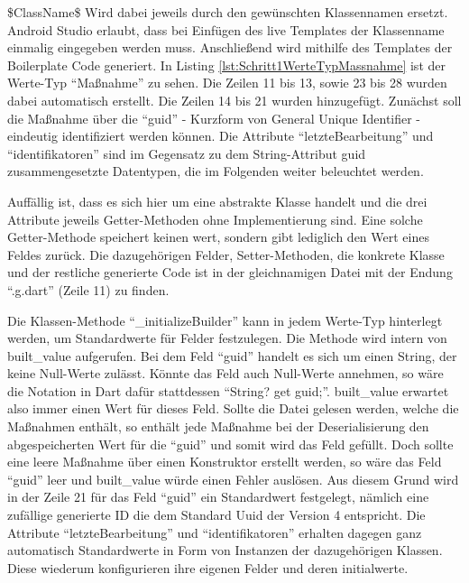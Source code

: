 \$ClassName\$ Wird dabei jeweils durch den gewünschten Klassennamen ersetzt. Android Studio erlaubt, dass bei Einfügen des live Templates der Klassenname einmalig eingegeben werden muss.  Anschließend wird mithilfe des Templates der Boilerplate Code generiert. In Listing \ref{lst:Schritt1WerteTypMassnahme} ist der Werte-Typ \enquote{Maßnahme} zu sehen. Die Zeilen 11 bis 13, sowie 23 bis 28 wurden dabei automatisch erstellt. Die Zeilen 14 bis 21 wurden hinzugefügt. Zunächst soll die Maßnahme über die \enquote{guid} - Kurzform von General Unique Identifier - eindeutig identifiziert werden können.
Die Attribute \enquote{letzteBearbeitung} und \enquote{identifikatoren} sind im Gegensatz zu dem String-Attribut guid zusammengesetzte Datentypen, die im Folgenden weiter beleuchtet werden.

Auffällig ist, dass es sich hier um eine abstrakte Klasse handelt und die drei Attribute jeweils Getter-Methoden ohne Implementierung sind. Eine solche Getter-Methode speichert keinen wert, sondern gibt lediglich den Wert eines Feldes zurück. Die dazugehörigen Felder,  Setter-Methoden, die konkrete Klasse und der restliche generierte Code ist in der gleichnamigen Datei mit der Endung \enquote{.g.dart} (Zeile 11) zu finden.

Die Klassen-Methode \enquote{_initializeBuilder} kann in jedem Werte-Typ hinterlegt werden, um Standardwerte für Felder festzulegen.
Die Methode wird intern von built_value aufgerufen. Bei dem Feld \enquote{guid} handelt es sich um einen String, der keine Null-Werte zulässt. Könnte das Feld auch Null-Werte annehmen, so wäre die Notation in Dart dafür stattdessen \enquote{String? get guid;}. built_value erwartet also immer einen Wert für dieses Feld. Sollte die Datei gelesen werden, welche die Maßnahmen enthält, so enthält jede Maßnahme bei der Deserialisierung den abgespeicherten Wert für die \enquote{guid} und somit wird das Feld gefüllt. Doch sollte eine leere Maßnahme über einen Konstruktor erstellt werden, so wäre das Feld \enquote{guid} leer und built_value würde einen Fehler auslösen. Aus diesem Grund wird in der Zeile 21 für das Feld \enquote{guid} ein Standardwert festgelegt, nämlich eine zufällige  generierte ID die dem Standard Uuid der Version 4 entspricht. 
Die Attribute \enquote{letzteBearbeitung} und \enquote{identifikatoren} erhalten dagegen ganz automatisch Standardwerte in Form von Instanzen der dazugehörigen Klassen. Diese wiederum konfigurieren ihre eigenen Felder und deren initialwerte.

